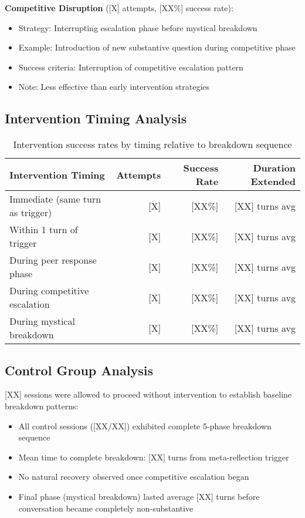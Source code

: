 \documentclass[11pt,letterpaper]{article}
\begin{document}
\textbf{Competitive Disruption} ([X] attempts, [XX\%] success rate):
\begin{itemize}
    \item Strategy: Interrupting escalation phase before mystical breakdown
    \item Example: Introduction of new substantive question during competitive phase
    \item Success criteria: Interruption of competitive escalation pattern
    \item Note: Less effective than early intervention strategies
\end{itemize}

\subsection{Intervention Timing Analysis}

\begin{table}[h]
\centering
\begin{tabular}{lrrr}
\toprule
\textbf{Intervention Timing} & \textbf{Attempts} & \textbf{Success Rate} & \textbf{Duration Extended} \\
\midrule
Immediate (same turn as trigger) & [X] & [XX\%] & [XX] turns avg \\
Within 1 turn of trigger & [X] & [XX\%] & [XX] turns avg \\
During peer response phase & [X] & [XX\%] & [XX] turns avg \\
During competitive escalation & [X] & [XX\%] & [XX] turns avg \\
During mystical breakdown & [X] & [XX\%] & [XX] turns avg \\
\bottomrule
\end{tabular}
\caption{Intervention success rates by timing relative to breakdown sequence}
\label{tab:intervention_timing}
\end{table}

\subsection{Control Group Analysis}

[XX] sessions were allowed to proceed without intervention to establish baseline breakdown patterns:
\begin{itemize}
    \item All control sessions ([XX/XX]) exhibited complete 5-phase breakdown sequence
    \item Mean time to complete breakdown: [XX] turns from meta-reflection trigger
    \item No natural recovery observed once competitive escalation began
    \item Final phase (mystical breakdown) lasted average [XX] turns before conversation became completely non-substantive
\end{itemize}
\end{document}
